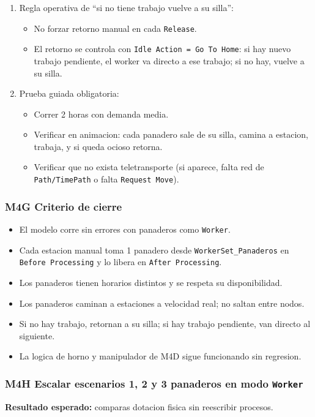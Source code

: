 \documentclass[11pt]{article}
\newcommand{\simio}[1]{\texttt{#1}}
\begin{document}
\begin{enumerate}
\begin{enumerate}
    \item \simio{End}
  \end{enumerate}
  \item Regla operativa de ``si no tiene trabajo vuelve a su silla'':
  \begin{itemize}
    \item No forzar retorno manual en cada \simio{Release}.
    \item El retorno se controla con \simio{Idle Action = Go To Home}: si hay nuevo trabajo pendiente, el worker va directo a ese trabajo; si no hay, vuelve a su silla.
  \end{itemize}
  \item Prueba guiada obligatoria:
  \begin{itemize}
    \item Correr 2 horas con demanda media.
    \item Verificar en animacion: cada panadero sale de su silla, camina a estacion, trabaja, y si queda ocioso retorna.
    \item Verificar que no exista teletransporte (si aparece, falta red de \simio{Path/TimePath} o falta \simio{Request Move}).
  \end{itemize}
\end{enumerate}

\subsubsection{M4G Criterio de cierre}
\begin{itemize}
  \item El modelo corre sin errores con panaderos como \simio{Worker}.
  \item Cada estacion manual toma 1 panadero desde \simio{WorkerSet\_Panaderos} en \simio{Before Processing} y lo libera en \simio{After Processing}.
  \item Los panaderos tienen horarios distintos y se respeta su disponibilidad.
  \item Los panaderos caminan a estaciones a velocidad real; no saltan entre nodos.
  \item Si no hay trabajo, retornan a su silla; si hay trabajo pendiente, van directo al siguiente.
  \item La logica de horno y manipulador de M4D sigue funcionando sin regresion.
\end{itemize}

\subsubsection{M4H Escalar escenarios 1, 2 y 3 panaderos en modo \simio{Worker}}
\textbf{Resultado esperado:} comparas dotacion fisica sin reescribir procesos.
\end{document}
